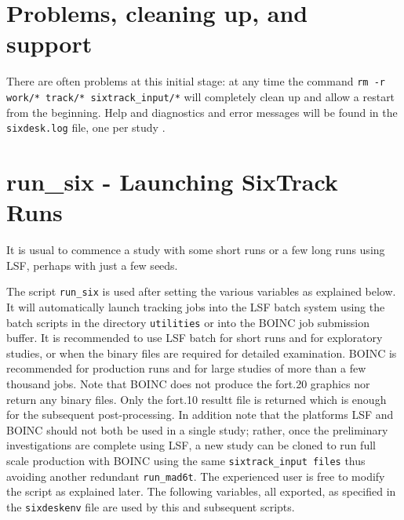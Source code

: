 \documentclass{cernatsnote}    %
\begin{document}
\section{Problems, cleaning up, and support} 
There are often problems at this initial stage: at any time the command
{\tt rm -r work/* track/* sixtrack\_input/*} will completely clean up
and allow a restart from the beginning. Help 
and diagnostics and error messages will be found
in the {\tt sixdesk.log} file, one per study \footnotemark.

\section{run\_six - Launching SixTrack Runs}
%
\label{sec:run_six}
It is usual to commence a study with some short runs or a 
few long runs using LSF, perhaps with just a few seeds.

The script {\tt run\_six} is used after setting the various
variables as explained below.
It will automatically launch tracking jobs into the LSF batch
system using the batch scripts in the directory {\tt utilities}
or into the BOINC job submission buffer.
It is recommended to use LSF batch for short runs and for exploratory studies,
or when the binary files are required for detailed examination.
BOINC is recommended for production runs and for large studies of more than 
a few thousand jobs. Note that BOINC does not produce the fort.20 graphics nor
return any binary files. Only the fort.10 resultt file is returned which is
enough for the subsequent post-processing. 
In addition note that the platforms LSF and BOINC should
not both be used in a single study; rather, once the preliminary investigations
are complete using LSF, a new study can be cloned to run full scale
production with BOINC using the same {\tt sixtrack\_input files} thus
avoiding another redundant {\tt run\_mad6t}. 
The experienced user is free to modify the script as explained later.
The following variables, all exported, as specified in the {\tt sixdeskenv} file
are used by this and subsequent scripts.
\end{document}

